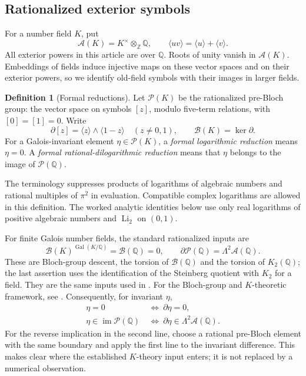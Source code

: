 \documentclass[11pt]{article}
\numberwithin{equation}{section}
\theoremstyle{definition}
\newtheorem{definition}[theorem]{Definition}
\theoremstyle{remark}
\newcommand{\Q}{\mathbb Q}
\newcommand{\Z}{\mathbb Z}
\newcommand{\A}{\mathcal A}
\newcommand{\B}{\mathcal B}
\newcommand{\Pcal}{\mathcal P}
\newcommand{\cl}[1]{\langle #1\rangle}
\DeclareMathOperator{\Li}{Li}
\DeclareMathOperator{\Gal}{Gal}
\begin{document}
\subsection{Rationalized exterior symbols}

For a number field $K$, put
\[
 \A(K)=K^\times\otimes_\Z\Q,
 \qquad \cl{uv}=\cl u+\cl v.
\]
All exterior powers in this article are over $\Q$. Roots of unity vanish
in $\A(K)$. Embeddings of fields induce injective maps on these vector
spaces and on their exterior powers, so we identify old-field symbols
with their images in larger fields.

\begin{definition}[Formal reductions]\label{def:formal}
Let $\Pcal(K)$ be the rationalized pre-Bloch group: the vector space on
symbols $[z]$, modulo five-term relations, with $[0]=[1]=0$. Write
\[
 \partial[z]=\cl z\wedge\cl{1-z}\quad(z\ne0,1),
 \qquad \B(K)=\ker\partial.
\]
For a Galois-invariant element $\eta\in\Pcal(K)$, a
\emph{formal logarithmic reduction} means $\eta=0$. A
\emph{formal rational-dilogarithmic reduction} means that $\eta$ belongs
to the image of $\Pcal(\Q)$.
\end{definition}

The terminology suppresses products of logarithms of algebraic numbers
and rational multiples of $\pi^2$ in evaluation. Compatible complex
logarithms are allowed in this definition. The worked analytic identities
below use only real logarithms of positive algebraic numbers and
$\Li_2$ on $(0,1)$.

For finite Galois number fields, the standard rationalized inputs are
\begin{equation}\label{eq:K-inputs}
 \B(K)^{\Gal(K/\Q)}=\B(\Q)=0,
 \qquad \partial\Pcal(\Q)=\Lambda^2\A(\Q).
\end{equation}
These are Bloch-group descent, the torsion of $\B(\Q)$ and the torsion
of $K_2(\Q)$; the last assertion uses the identification of the
Steinberg quotient with $K_2$ for a field. They are the same inputs used
in \cite[\S7.2]{RZ}. For the Bloch-group and $K$-theoretic framework,
see \cite{ZagierDilog,CGZ}. Consequently, for invariant $\eta$,
\begin{align}
 \eta=0&\ \Longleftrightarrow\ \partial\eta=0,
 \label{eq:zero-detection}\\
 \eta\in\operatorname{im}\Pcal(\Q)
 &\ \Longleftrightarrow\
 \partial\eta\in\Lambda^2\A(\Q).
 \label{eq:rational-detection}
\end{align}
For the reverse implication in the second line, choose a rational
pre-Bloch element with the same boundary and apply the first line to
the invariant difference. This makes clear where the established
$K$-theory input enters; it is not replaced by a numerical observation.
\end{document}
